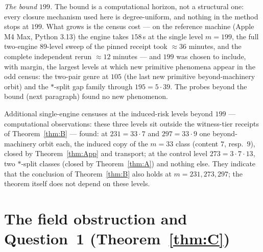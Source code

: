 \documentclass[11pt]{amsart}
\theoremstyle{remark}
\begin{document}
\emph{The bound $199$.} The bound is a computational horizon, not a structural one: every
closure mechanism used here is degree-uniform, and nothing in the method stops at $199$. What
grows is the census cost --- on the reference machine (Apple M4 Max, Python 3.13) the engine
takes $158$\,s at the single level $m=199$, the full two-engine $89$-level sweep of the pinned
receipt took $\approx36$ minutes, and the complete independent rerun $\approx12$ minutes --- and $199$ was
chosen to include, with margin, the largest levels at which new primitive phenomena appear in
the odd census: the two-pair genre at $105$ (the last new primitive beyond-machinery orbit) and
the $*$-split gap family through $195=5\cdot39$. The probes beyond the bound (next paragraph)
found no new phenomenon.

Additional
single-engine censuses at the induced-risk levels beyond $199$ --- computational observations:
these three levels sit outside the witness-tier receipts of Theorem~\ref{thm:B} --- found: at
$231=33\cdot7$ and
$297=33\cdot9$ one beyond-machinery orbit each, the induced copy of the $m=33$ class (content $7$,
resp.\ $9$), closed by Theorem~\ref{thm:App} and transport; at the control level $273=3\cdot7\cdot13$,
two $*$-split classes (closed by Theorem~\ref{thm:A}) and nothing else. They indicate that the
conclusion of Theorem~\ref{thm:B} also holds at $m=231,273,297$; the theorem itself does not
depend on these levels.

\section{The field obstruction and Question~1 (Theorem~\ref{thm:C})}\label{sec:C}
\end{document}
